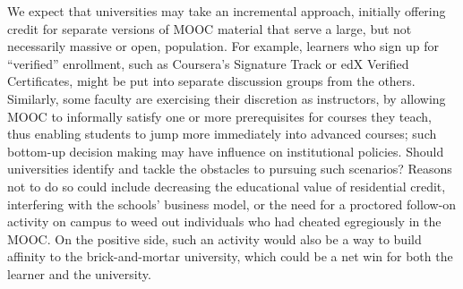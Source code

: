 We expect that universities may take an
incremental approach, initially offering
credit for separate versions of MOOC material that serve a large, but
not necessarily massive or open, population.
For example, learners who sign up for ``verified''
enrollment, such as Coursera's Signature Track or edX Verified
Certificates, might be put
into separate discussion groups from the others.
Similarly, some faculty are exercising their
discretion as instructors, by allowing MOOC to informally satisfy one or
more prerequisites for courses they teach, thus enabling students to jump
more immediately into advanced courses; such bottom-up decision making may
have influence on institutional policies.
Should universities identify and tackle the obstacles to pursuing such scenarios?
Reasons not to do so could include decreasing the educational value of
residential credit, interfering with the schools' business model, or the
need for a proctored follow-on activity on campus to
weed out individuals who had cheated egregiously in the MOOC.  On the
positive side, such an activity would also be a way to build affinity to
the brick-and-mortar university, which could be a net win for both the
learner and the university.
 


